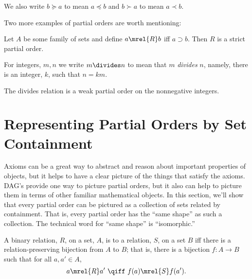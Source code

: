 \begin{editingnotes}

We also write $b \succeq a$ to
mean $a \preceq b$ and $b \succ a$ to mean $a \prec b$.

\end{editingnotes}

Two more examples of partial orders are worth mentioning:

\begin{example}\label{supset}
Let $A$ be some family of sets and define $a \mrel{R} b$ iff $a
\supset b$.  Then $R$ is a strict partial order.
\end{example}

For integers, $m,n$ we write $m \divides n$ to mean that $m$
\emph{divides} $n$, namely, there is an integer, $k$, such that $n=km$.

\begin{example}\label{divides}
The divides relation is a weak partial order on the nonnegative integers.
\end{example}

\section{Representing Partial Orders by Set Containment}\label{poset-as-sets_sec}

Axioms can be a great way to abstract and reason about important
properties of objects, but it helps to have a clear picture of the
things that satisfy the axioms.  DAG's provide one way to picture
partial orders, but it also can help to picture them in terms of other
familiar mathematical objects.  In this section, we'll show that every
partial order can be pictured as a collection of sets related by
containment.  That is, every partial order has the ``same shape'' as
such a collection.  The technical word for ``same shape'' is
``isomorphic.''

\begin{definition}\label{relation-isomorphism}
  A binary relation, $R$, on a set, $A$, is
   to a relation, $S$, on a set $B$ iff there is a
  relation-preserving bijection from $A$ to $B$; that is, there is
  a bijection $f:A \to B$ such that for all $a,a' \in A$,
  \[
  a \mrel{R} a'\ \qiff\ f(a) \mrel{S} f(a').
  \]
\end{definition}

